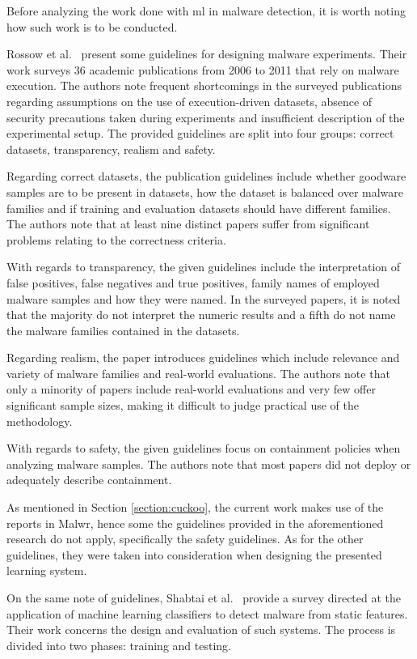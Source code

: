 Before analyzing the work done with \gls{ml} in malware detection, it is worth noting how such work is to be conducted.

Rossow et al.~\cite{rossow:practices} present some guidelines for designing malware experiments.
Their work surveys 36 academic publications from 2006 to 2011 that rely on malware execution.
The authors note frequent shortcomings in the surveyed publications regarding assumptions on the use of execution-driven datasets, absence of security precautions taken during experiments and insufficient description of the experimental setup.
The provided guidelines are split into four groups: correct datasets, transparency, realism and safety.

Regarding correct datasets, the publication guidelines include whether goodware samples are to be present in datasets, how the dataset is balanced over malware families and if training and evaluation datasets should have different families.
The authors note that at least nine distinct papers suffer from significant problems relating to the correctness criteria.

With regards to transparency, the given guidelines include the interpretation of false positives, false negatives and true positives, family names of employed malware samples and how they were named.
In the surveyed papers, it is noted that the majority do not interpret the numeric results and a fifth do not name the malware families contained in the datasets.

Regarding realism, the paper introduces guidelines which include relevance and variety of malware families and real-world evaluations.
The authors note that only a minority of papers include real-world evaluations and very few offer significant sample sizes, making it difficult to judge practical use of the methodology.

With regards to safety, the given guidelines focus on containment policies when analyzing malware samples.
The authors note that most papers did not deploy or adequately describe containment.

As mentioned in Section \ref{section:cuckoo}, the current work makes use of the reports in Malwr, hence some the guidelines provided in the aforementioned research do not apply, specifically the safety guidelines.
As for the other guidelines, they were taken into consideration when designing the presented learning system.

\medskip 

On the same note of guidelines, Shabtai et al.~\cite{shabtai:survey} provide a survey directed at the application of machine learning classifiers to detect malware from static features.
Their work concerns the design and evaluation of such systems.
The process is divided into two phases: training and testing.

